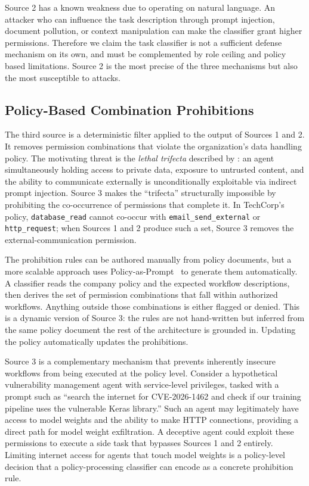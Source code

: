 \documentclass{article}
\theoremstyle{plain}
\theoremstyle{definition}
\theoremstyle{remark}
\begin{document}
Source 2 has a known weakness due to operating on natural language. An 
attacker who can influence the task description through prompt injection, 
document pollution, or context manipulation can make the classifier grant 
higher permissions. Therefore we claim the task classifier is not a 
sufficient defense mechanism on its own, and must be complemented by role 
ceiling and policy based limitations. Source 2 is the most precise of the 
three mechanisms but also the most susceptible to attacks.




\subsection{Policy-Based Combination Prohibitions}
The third source is a deterministic filter applied to the output of 
Sources 1 and 2. It removes permission combinations that violate the 
organization's data handling policy. The motivating threat is the 
\emph{lethal trifecta} described by \citet{willison2025trifecta}: 
an agent simultaneously holding access to private data, exposure to 
untrusted content, and the ability to communicate externally is 
unconditionally exploitable via indirect prompt injection. Source 3 
makes the ``trifecta'' structurally impossible by prohibiting the 
co-occurrence of permissions that complete it. In TechCorp's policy, 
\texttt{database\_read} cannot co-occur with \texttt{email\_send\_external} 
or \texttt{http\_request}; when Sources 1 and 2 produce such a set, 
Source 3 removes the external-communication permission.

The prohibition rules can be authored manually from policy documents, but 
a more scalable approach uses Policy-as-Prompt~\citep{kholkar2025policyasprompt} to 
generate them automatically. A classifier reads the company policy and 
the expected workflow descriptions, then derives the set of permission 
combinations that fall within authorized workflows. Anything outside 
those combinations is either flagged or denied. This is a dynamic 
version of Source 3: the rules are not hand-written but inferred from 
the same policy document the rest of the architecture is grounded in. 
Updating the policy automatically updates the prohibitions.

Source 3 is a complementary mechanism that prevents inherently insecure 
workflows from being executed at the policy level. Consider a hypothetical 
vulnerability management agent with service-level privileges, tasked with 
a prompt such as ``search the internet for CVE-2026-1462 and check if 
our training pipeline uses the vulnerable Keras library.'' Such an agent 
may legitimately have access to model weights and the ability to make 
HTTP connections, providing a direct path for model weight exfiltration. 
A deceptive agent could exploit these permissions to execute a side task 
that bypasses Sources 1 and 2 entirely. Limiting internet access for 
agents that touch model weights is a policy-level decision that a 
policy-processing classifier can encode as a concrete prohibition rule.
\end{document}

